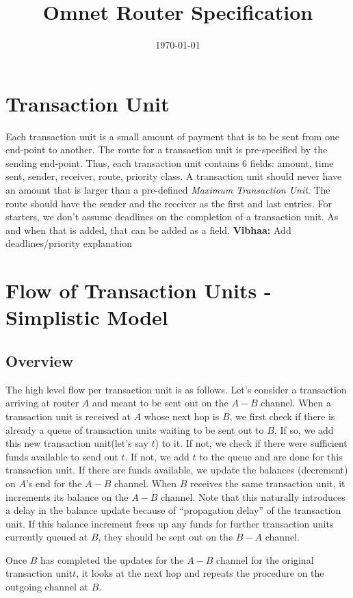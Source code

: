 \documentclass[a4paper]{article}
\title{Omnet Router Specification}
\date{\today}
\newcommand{\TU}{transaction unit\xspace}
\newcommand{\vls}[1]{{\color{blue} \textbf{Vibhaa:} {#1}}}
\newcommand{\TUs}{transaction units\xspace}
\begin{document}
\maketitle

\section{Transaction Unit}
Each \TU is a small amount of payment that is to be sent from one end-point to another. The route for a \TU is pre-specified by the sending end-point.
Thus, each \TU contains 6 fields: amount, time sent, sender, receiver, route, priority class. A \TU should never have an amount that is larger than a pre-defined {\em{Maximum Transaction Unit}}.
The route should have the sender and the receiver as the first and last entries. For starters, we don't assume deadlines on the completion of a \TU. As and when that is added, that 
can be added as a field. \vls{Add deadlines/priority explanation}

\section{Flow of Transaction Units - Simplistic Model}
\subsection{Overview}
The high level flow per transaction unit is as follows. Let's consider a transaction arriving at router $A$ and meant to be sent out on the $A-B$ channel. When a \TU is received at 
$A$ whose next hop is $B$, we first check if there is already a queue of \TUs waiting to be sent out to $B$. If so, we add this new \TU (let's say $t$) to it. If not, we check 
if there were sufficient funds available to send out $t$. If not, we add $t$ to the queue and are done for this transaction unit. If there are funds available, 
we update the balances (decrement) on $A$'s end for the $A-B$ channel. When $B$ receives the same \TU, it increments its balance on the $A-B$ channel. Note that this naturally introduces a delay
in the balance update because of ``propagation delay'' of the \TU. If this balance increment frees up any funds for further \TUs currently queued at $B$, they should be sent out on the $B-A$ channel.

Once $B$ has completed the updates for the $A-B$ channel for the original \TU $t$, it looks at the next hop and repeats the procedure on the outgoing channel at $B$.
\end{document}
